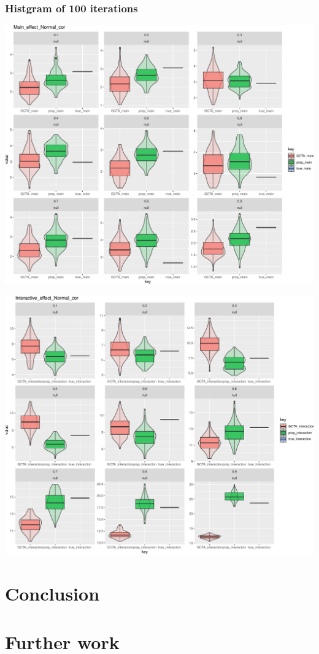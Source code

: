 \documentclass[]{article}
\begin{document}

\clearpage

\subsubsection{Histgram of 100
iterations}\label{histgram-of-100-iterations}

\includegraphics{Norl_cor_simulation_files/figure-latex/normal_main-1.pdf}

\includegraphics{Norl_cor_simulation_files/figure-latex/normal_inter-1.pdf}

\section{Conclusion}\label{conclusion}

\section{Further work}\label{further-work}
\end{document}
